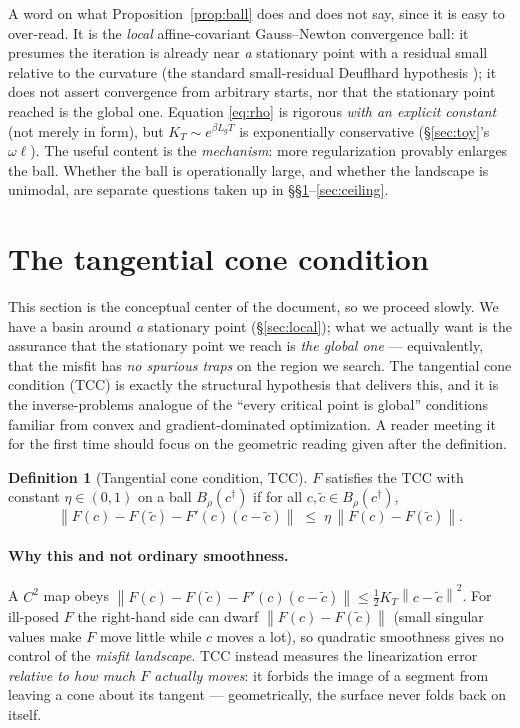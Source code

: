 \documentclass[11pt]{article}
\theoremstyle{plain}
\theoremstyle{definition}
\newtheorem{definition}[theorem]{Definition}
\theoremstyle{remark}
\newcommand{\norm}[1]{\left\lVert#1\right\rVert}
\begin{document}
A word on what Proposition~\ref{prop:ball} does and does not say, since it
is easy to over-read. It is the \emph{local} affine-covariant
Gauss--Newton convergence ball: it presumes the iteration is already near
\emph{a} stationary point with a residual small relative to the curvature
(the standard small-residual Deuflhard hypothesis \cite{deuflhard2004});
it does not assert convergence from arbitrary starts, nor that the
stationary point reached is the global one. Equation \eqref{eq:rho} is
rigorous \emph{with an explicit constant} (not merely in form), but
$K_T\sim e^{\beta L_gT}$ is exponentially conservative
(\S\ref{sec:toy}'s $\omega\ell$). The useful content is the
\emph{mechanism}: more regularization provably enlarges the ball. Whether
the ball is operationally large, and whether the landscape is unimodal,
are separate questions taken up in
\S\S\ref{sec:tcc}--\ref{sec:ceiling}.

\section{The tangential cone condition}\label{sec:tcc}

This section is the conceptual center of the document, so we proceed
slowly. We have a basin around \emph{a} stationary point
(\S\ref{sec:local}); what we actually want is the assurance that the
stationary point we reach is \emph{the global one} --- equivalently, that
the misfit has \emph{no spurious traps} on the region we search. The
tangential cone condition (TCC) is exactly the structural hypothesis that
delivers this, and it is the inverse-problems analogue of the
``every critical point is global'' conditions familiar from convex and
gradient-dominated optimization. A reader meeting it for the first time
should focus on the geometric reading given after the definition.

\begin{definition}[Tangential cone condition, TCC]\label{def:tcc}
$F$ satisfies the TCC with constant $\eta\in(0,1)$ on a ball
$B_\rho(c^{\dagger})$ if for all $c,\tilde c\in B_\rho(c^{\dagger})$,
\begin{equation}
\norm{F(c)-F(\tilde c)-F'(c)(c-\tilde c)}\;\le\;
\eta\,\norm{F(c)-F(\tilde c)} .
\label{eq:tcc}
\end{equation}
\end{definition}

\paragraph{Why this and not ordinary smoothness.} A $C^{2}$ map obeys
$\norm{F(c)-F(\tilde c)-F'(c)(c-\tilde c)}\le\tfrac12 K_T
\norm{c-\tilde c}^{2}$. For ill-posed $F$ the right-hand side can dwarf
$\norm{F(c)-F(\tilde c)}$ (small singular values make $F$ move little
while $c$ moves a lot), so quadratic smoothness gives no control of the
\emph{misfit landscape}. TCC instead measures the linearization error
\emph{relative to how much $F$ actually moves}: it forbids the image of a
segment from leaving a cone about its tangent --- geometrically, the
surface never folds back on itself.
\end{document}
